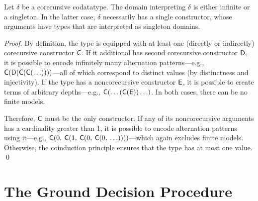 \begin{lemma}%
\label{lem:corecursive-singletons}%
\afterDot
Let $\delta$ be a corecursive codatatype. The domain interpreting $\delta$ is
either infinite or a singleton. In the latter case, $\delta$ necessarily has a
single constructor, whose arguments have types that are interpreted as
singleton domains.
\end{lemma}

\begin{rep}
\begin{proof}
By definition, the type is equipped with at least one (directly or indirectly)
corecursive constructor $\textsf{C}$. If it additional has second
corecursive constructor $\textsf{D}$, it is possible to encode infinitely many
alternation patterns---e.g.,
$\textsf{C}(\textsf{D}(\textsf{C}(\textsf{C}(\ldots))))$---all of which correspond
to distinct values (by distinctness and injectivity). If the type has a
noncorecursive constructor $\textsf{E}$, it is possible to create terms of
arbitrary depths---e.g., $\textsf{C}(\ldots(\textsf{C}(\textsf{E}))\ldots)$. In
both cases, there can be no finite models.

Therefore, $\textsf{C}$ must be the only constructor.
If any of its noncorecursive arguments has a cardinality greater than 1,
it is possible to encode alternation patterns using it---e.g.,
$\textsf{C}(0,\: \textsf{C}(1,\: \textsf{C}(0,\: \textsf{C}(0,\: \ldots))))$---which
again excludes finite models. Otherwise, the coinduction principle ensures
that the type has at most one value.
\qed
\end{proof}
\end{rep}


\section{The Ground Decision Procedure} %
\label{sec:the-ground-decision-procedure}

